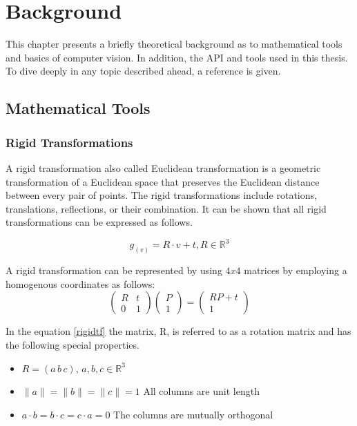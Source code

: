 
\chapter{Background}
\label{chap:back}

This chapter presents a briefly theoretical background as to mathematical tools and basics of computer vision. In addition, the API and tools used in this thesis. To dive deeply in any topic described ahead, a reference is given.


\section{ Mathematical Tools}
\subsection{Rigid Transformations}\label{rigidtf0}
A rigid transformation also called Euclidean transformation is a geometric transformation of a Euclidean space that preserves the Euclidean distance between every pair of points. The rigid transformations include rotations, translations, reflections, or their combination. It can be shown that all rigid transformations can be expressed as follows.

\begin{equation}\label{rigidtf}
 g_(v)=R \cdot v + t, R \in \mathbb{R}^{3}
\end{equation}

A rigid transformation can be represented by using $4x4$ matrices by employing a homogenous coordinates as follows:
$$
\begin{pmatrix}
R & t \\
0 & 1
\end{pmatrix}
\begin{pmatrix}
P \\
1
\end{pmatrix}=
\begin{pmatrix}
RP+t \\
1
\end{pmatrix}
$$

 In the equation \ref{rigidtf} the matrix, R, is referred to as a rotation matrix and has the following special properties.
\begin{itemize}
\item $R=(a\,  b\,  c), \, a,b,c \in \mathbb{R}^{3}$
\item $\|a\|=\|b\|=\|c\|=1 $ All columns are unit length
\item $a \cdot b=b \cdot c=c \cdot a=0 $ The columns are mutually orthogonal
\end{itemize}
